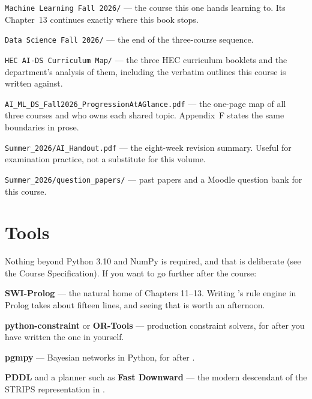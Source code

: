 \begin{tight}
  \item \texttt{Machine Learning Fall 2026/} --- the course this one hands
        learning to. Its Chapter~13 continues  exactly where this
        book stops.
  \item \texttt{Data Science Fall 2026/} --- the end of the three-course sequence.
  \item \texttt{HEC AI-DS Curriculum Map/} --- the three HEC curriculum booklets
        and the department's analysis of them, including the verbatim outlines this
        course is written against.
  \item \texttt{AI\_ML\_DS\_Fall2026\_ProgressionAtAGlance.pdf} --- the one-page
        map of all three courses and who owns each shared topic. Appendix~F states
        the same boundaries in prose.
  \item \texttt{Summer\_2026/AI\_Handout.pdf} --- the eight-week revision summary.
        Useful for examination practice, not a substitute for this volume.
  \item \texttt{Summer\_2026/question\_papers/} --- past papers and a Moodle
        question bank for this course.
\end{tight}

\section{Tools}

Nothing beyond Python 3.10 and NumPy is required, and that is deliberate
(see the Course Specification). If you want to go further after the course:

\begin{tight}
  \item \textbf{SWI-Prolog} --- the natural home of Chapters 11--13. Writing
        's rule engine in Prolog takes about fifteen lines, and
        seeing that is worth an afternoon.
  \item \textbf{python-constraint} or \textbf{OR-Tools} --- production constraint
        solvers, for after you have written the one in  yourself.
  \item \textbf{pgmpy} --- Bayesian networks in Python, for after .
  \item \textbf{PDDL} and a planner such as \textbf{Fast Downward} --- the modern
        descendant of the STRIPS representation in .
\end{tight}

